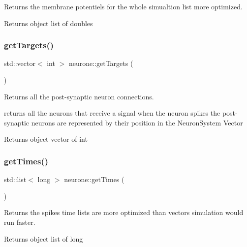 Returns the membrane potentiels for the whole simualtion list more optimized. 

\begin{DoxyReturn}{Returns}
object list of doubles 
\end{DoxyReturn}
\mbox{\label{classneurone_a9570ddccdc114d63de75d2c454fbcb52}} 
\subsubsection{\texorpdfstring{get\+Targets()}{getTargets()}}
{\footnotesize\ttfamily std\+::vector$<$ int $>$ neurone\+::get\+Targets (\begin{DoxyParamCaption}{ }\end{DoxyParamCaption})}



Returns all the post-\/synaptic neuron connections. 

returns all the neurons that receive a signal when the neuron spikes the post-\/synaptic neurons are represented by their position in the Neuron\+System Vector

\begin{DoxyReturn}{Returns}
object vector of int 
\end{DoxyReturn}
\mbox{\label{classneurone_a36c9b4a43331890178cf8ef774cf53f7}} 
\subsubsection{\texorpdfstring{get\+Times()}{getTimes()}}
{\footnotesize\ttfamily std\+::list$<$ long $>$ neurone\+::get\+Times (\begin{DoxyParamCaption}{ }\end{DoxyParamCaption})}



Returns the spikes time lists are more optimized than vectors simulation would run faster. 

\begin{DoxyReturn}{Returns}
object list of long 
\end{DoxyReturn}
\mbox{\label{classneurone_ae3f754b75dc3f92cd9964785d4f6b935}} 

